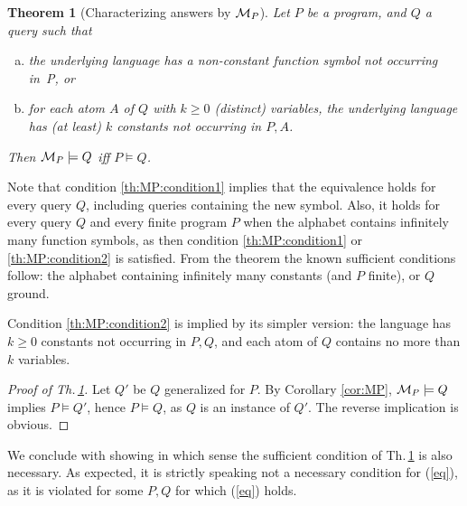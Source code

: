 \documentclass[a4paper]{tlp2}
\newtheorem{theorem}{Theorem}
\newcommand*{\M}{{\ensuremath{\cal M}}\xspace}
\begin{document}
\begin{theorem}
[Characterizing answers by $\M_P$]
\label{th:MP}
Let $P$ be a program, and $Q$ a query such that
\begin{enumerate}[(a)]
\item 
\label{th:MP:condition1}
the underlying language has a non-constant function symbol not occurring in~P,
or 
\item 
\label{th:MP:condition2}
for each atom $A$ of $Q$ with  $k\geq0$ (distinct) variables,
the underlying language has (at least) $k$ constants not occurring in $P,A$.
\nopagebreak
\end{enumerate}
\nopagebreak
Then $\M_P\models Q$ iff $P\models Q$.
\end{theorem}

Note that condition \ref{th:MP:condition1}
 implies that the equivalence holds for every query $Q$,
including queries containing the new symbol.
Also, it holds for every query $Q$ and every finite program $P$ when the
alphabet contains infinitely many function symbols, as then 
condition  \ref{th:MP:condition1} or \ref{th:MP:condition2} is satisfied.
From the theorem the known sufficient conditions follow: 
the alphabet containing infinitely many constants (and $P$ finite),
or $Q$ ground.



Condition \ref{th:MP:condition2}
is implied by its simpler version:
the language has $k\geq0$ constants not occurring in $P,Q$, 
 and each atom of $Q$ contains no more than $k$ variables.


\begin{proof}[Proof of Th.\,\ref{th:MP}]
Let $Q'$ be $Q$ generalized for $P$.
By Corollary \ref{cor:MP},
 $\M_P\models Q$ implies $P\models Q'$, hence $P\models Q$, as $Q$ is an
instance of $Q'$.
The reverse implication is obvious.
\end{proof}









We conclude with showing in which sense
the sufficient condition of Th.\,\ref{th:MP}
is also necessary.  As expected, it is strictly speaking not a necessary
condition for (\ref{eq}), 
as it is violated for some $P,Q$ for which (\ref{eq}) holds. 
\end{document}
